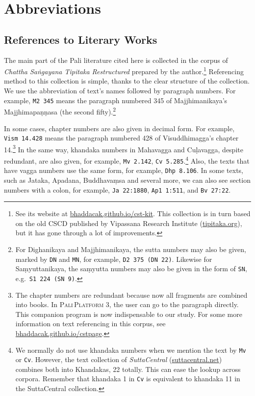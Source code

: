 \clearpage
{}
{}
\setcounter{footnote}{0}
\chapter*{Abbreviations}

\section*{References to Literary Works}

The main part of the P\a{=}ali literature cited here is collected in the corpus of \emph{Chattha Sa\.ng\a{=}ayana Tipitaka Restructured} prepared by the author.\footnote{See its website at \url{bhaddacak.github.io/cst-kit}. This collection is in turn based on the old CSCD published by Vipassana Research Institute (\url{tipitaka.org}), but it has gone through a lot of improvements.} Referencing method to this collection is simple, thanks to the clear structure of the collection. We use the abbreviation of text's names followed by paragraph numbers. For example, \texttt{M2\,345} means the paragraph numbered 345 of Majjhimanik\a{=}aya's Majjhimapa\d n\d n\a{=}asa (the second fifty).\footnote{For D\a{=}ighanik\a{=}aya and Majjhimanik\a{=}aya, the sutta numbers may also be given, marked by \texttt{DN} and \texttt{MN}, for example, \texttt{D2\,375 (DN\,22)}. Likewise for Sa\d myuttanik\a{=}aya, the sa\d myutta numbers may also be given in the form of \texttt{SN}, e.g.\ \texttt{S1\,224 (SN\,9)}.}

In some cases, chapter numbers are also given in decimal form. For example, \texttt{Vism\,14.428} means the paragraph numbered 428 of Visuddhimagga's chapter 14.\footnote{The chapter numbers are redundant because now all fragments are combined into books. In \textsc{P\a{=}ali\,Platform} 3, the user can go to the paragraph directly. This companion program is now indispensable to our study. For some more information on text referencing in this corpus, see \url{bhaddacak.github.io/cstpage}.} In the same way, khandaka numbers in Mah\a{=}avagga and C\a{=}u\d lavagga, despite redundant, are also given, for example, \texttt{Mv\,2.142}, \texttt{Cv\,5.285}.\footnote{We normally do not use khandaka numbers when we mention the text by \texttt{Mv} or \texttt{Cv}. However, the text collection of \emph{SuttaCentral} (\url{suttacentral.net}) combines both into Khandakas, 22 totally. This can ease the lookup across corpora. Remember that khandaka 1 in \texttt{Cv} is equivalent to khandaka 11 in the SuttaCentral collection.} Also, the texts that have vagga numbers use the same form, for example, \texttt{Dhp\,8.106}. In some texts, such as J\a{=}ataka, Apad\a{=}ana, Buddhava\d msa and several more, we can also see section numbers with a colon, for example, \texttt{Ja\,22:1880}, \texttt{Ap1\,1:511}, and \texttt{Bv\,27:22}.

